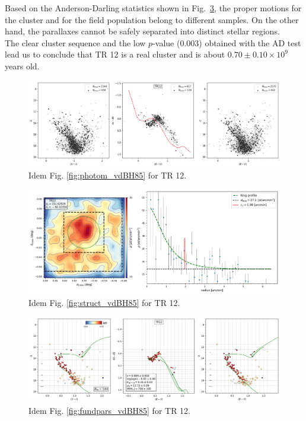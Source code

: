 \documentclass[draft]{aa}
\begin{document}
Based on the Anderson-Darling statistics shown in Fig.~\ref{fig21}, the
proper motions for the cluster and for the field population belong to different
samples. On the other hand, the parallaxes cannot be safely separated into
distinct stellar regions.\\

The clear cluster sequence and the low $p$-value (0.003) obtained with the AD
test lead us to conclude that TR 12 is a real cluster and is about
$0.70\pm0.10\times10^9$ years old.

\begin{figure}[ht]
    \centering
    \includegraphics[width=\hsize]{../figs/obs_TR12.png}
    \caption{Idem Fig. \ref{fig:photom_vdBH85} for TR 12.}
    \label{fig19}
\end{figure}
\begin{figure}[ht]
    \centering
    \includegraphics[width=\hsize]{../figs/dmap_trumpler12.png}
    \caption{Idem Fig. \ref{fig:struct_vdBH85} for TR 12.}
    \label{fig20}
\end{figure}
\begin{figure}[ht]
    \centering
    \includegraphics[width=\hsize]{../figs/cmds_tr12.png}
    \caption{Idem Fig. \ref{fig:fundpars_vdBH85} for TR 12.}
    \label{fig21}
\end{figure}
\end{document}
